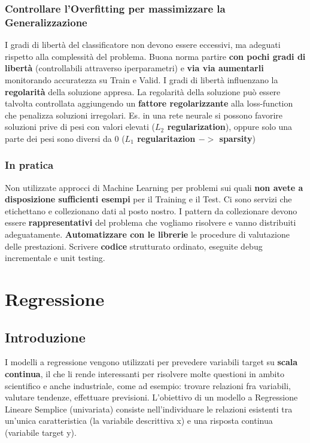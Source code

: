\documentclass{article}
\begin{document}
\subsubsection{Controllare l'Overfitting per massimizzare la Generalizzazione}
I gradi di libertà del classificatore non devono essere eccessivi, ma adeguati rispetto alla complessità del problema. Buona norma partire \textbf{con pochi gradi di libertà} (controllabili attraverso iperparametri) e \textbf{via via aumentarli} monitorando accuratezza su Train e Valid. I gradi di libertà influenzano la \textbf{regolarità} della soluzione appresa. La regolarità della soluzione può essere talvolta controllata aggiungendo un \textbf{fattore regolarizzante} alla loss-function che penalizza soluzioni irregolari. Es. in una rete neurale si possono favorire soluzioni prive di pesi con valori elevati (\textbf{$L_2$ regularization}), oppure solo una parte dei pesi sono diversi da 0 (\textbf{$L_1$ regularitazion $->$ sparsity})
\subsubsection{In pratica}
Non utilizzate approcci di Machine Learning per problemi sui quali \textbf{non avete a disposizione sufficienti esempi} per il Training e il Test. Ci sono servizi che etichettano e collezionano dati al posto nostro. I pattern da collezionare devono essere \textbf{rappresentativi} del problema che vogliamo risolvere e vanno distribuiti adeguatamente. \textbf{Automatizzare con le librerie} le procedure di valutazione delle prestazioni. Scrivere \textbf{codice} strutturato ordinato, eseguite debug incrementale e unit testing.

\section{Regressione}
\subsection{Introduzione}
I modelli a regressione vengono utilizzati per prevedere variabili target su \textbf{scala continua}, il che li rende interessanti per risolvere molte questioni in ambito scientifico e anche industriale, come ad esempio: trovare relazioni fra variabili, valutare tendenze, effettuare previsioni. L'obiettivo di un modello a Regressione Lineare Semplice (univariata) consiste nell'individuare le relazioni esistenti tra un'unica caratteristica (la variabile descrittiva x) e una risposta continua (variabile target y).
\end{document}
